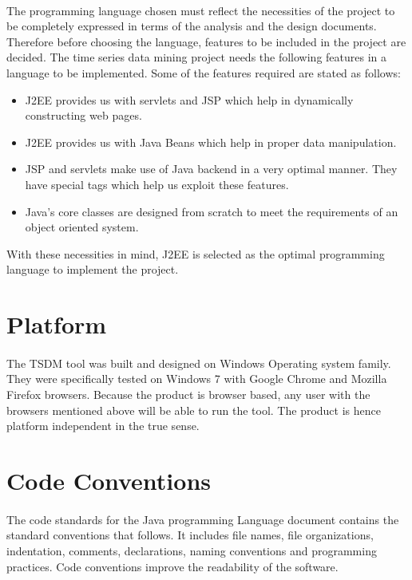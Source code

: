 \documentclass[12pt,a4paper]{report}
\begin{document}
\paragraph{}The programming language chosen must reflect the necessities of the project to be completely expressed in terms of the analysis and the design documents. Therefore before choosing the language, features to be included in the project are decided. The time series data mining project needs the following features in a language to be implemented. Some of the features required are stated as follows:
\begin{itemize}
\item J2EE provides us with servlets and JSP which help in dynamically constructing web pages.
\item J2EE provides us with Java Beans which help in proper data manipulation.
\item JSP and servlets make use of Java backend in a very optimal manner. They have special tags which help us exploit these features.
\item Java's core classes are designed from scratch to meet the requirements of an object oriented system.
\end{itemize} 
With these necessities in mind, J2EE is selected as the optimal programming language to implement the project.
\section{Platform}
\paragraph{}The TSDM tool was built and designed on Windows Operating system family. They were specifically tested on Windows 7 with Google Chrome and Mozilla Firefox browsers. Because the product is browser based, any user with the browsers mentioned above will be able to run the tool. The product is hence platform independent in the true sense.
\section{Code Conventions}
\paragraph{}The code standards for the Java programming Language document contains the standard conventions that follows. It includes file names, file organizations, indentation, comments, declarations, naming conventions and programming practices. Code conventions improve the readability of the software.
\end{document}
